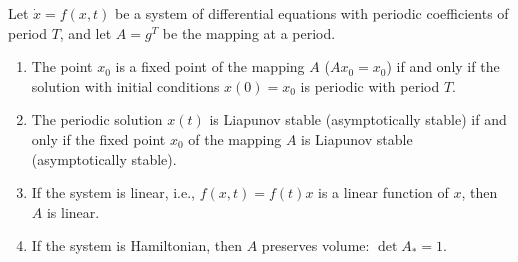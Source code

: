 Let $\dot{x} = f(x, t)$ be a system of differential equations with periodic coefficients of period $T$, and let $A = g^T$ be the mapping at a period.

\begin{enumerate}
\item The point $x_0$ is a fixed point of the mapping $A$ ($A x_0 = x_0$) if and only if the solution with initial conditions $x(0) = x_0$ is periodic with period $T$.
\item The periodic solution $x(t)$ is Liapunov stable (asymptotically stable) if and only if the fixed point $x_0$ of the mapping $A$ is Liapunov stable (asymptotically stable).
\item If the system is linear, i.e., $f(x, t) = f(t)x$ is a linear function of $x$, then $A$ is linear.
\item If the system is Hamiltonian, then $A$ preserves volume: $\det A_* = 1$.
\end{enumerate}
